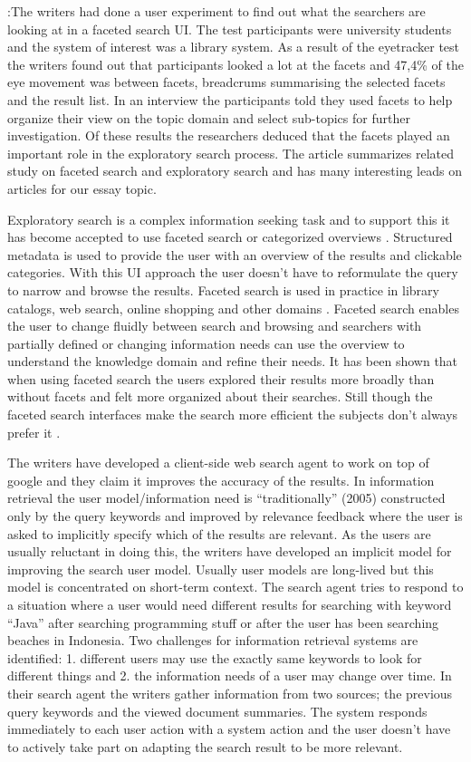 \documentclass{sigchi}
\begin{document}
\cite{kules09}:The writers had done a user experiment to find out what  the searchers are  looking at in a faceted search UI. The test participants were  university students and the system of interest was a library system. As a result  of the eyetracker test the writers found out that participants looked a lot at the facets and  47,4\% of the  eye movement  was between facets, breadcrums summarising the selected facets and the result list. In an interview the participants told they used facets to help organize their view on the topic domain and select sub-topics for further investigation. Of these results the researchers deduced that the facets played an important role in the exploratory search process. 
The article summarizes related study on faceted search and exploratory search and has many interesting leads on articles for our essay topic.

Exploratory search is a complex information seeking task and to support this it has become accepted to use faceted search or categorized overviews \cite{kules09}. Structured metadata is used to provide the user with an overview of the results and clickable categories. With this UI approach the user doesn't have to reformulate the query to narrow and browse the results. Faceted search is used in practice in library catalogs, web search, online shopping and other domains \cite{kules09}. Faceted search enables the user to change fluidly between search and browsing and searchers with partially defined or changing information needs can use the overview to understand the knowledge domain and refine their needs. It has been shown that when using faceted search the users explored their results more broadly than without facets and felt more organized about their searches. Still though the faceted search interfaces make the search more efficient the subjects don't always prefer it \cite{kules09}. 

\cite{shen05}The writers have developed a client-side web search agent to work on top of google and they claim it improves the accuracy of the results. In information retrieval the user model/information need is “traditionally” (2005) constructed only by the query keywords and improved by relevance feedback where the user is asked to implicitly specify which of the results are relevant. As the users are usually reluctant in doing this, the writers have developed an implicit model for improving the search user model. Usually user models are long-lived but this model is concentrated on short-term context. The search agent tries to respond to a situation where a user would need different results for searching with keyword “Java” after searching programming stuff or after the user has been searching beaches in Indonesia. Two challenges for information retrieval systems are identified: 1. different users may use the exactly same keywords to look for different things and 2. the information needs of a user may change over time. In their search agent the writers gather information from two sources; the previous query keywords and the viewed document summaries. The system responds immediately to each user action with a system action and the user doesn't have to actively take part on adapting the search result to be more relevant.
\end{document}
